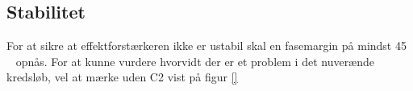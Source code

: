 \subsection{Stabilitet}
\label{effektforstaerker-stabilitet}

For at sikre at effektforstærkeren ikke er ustabil skal en fasemargin på mindst 45 \degrees~ opnås. For at kunne vurdere hvorvidt der er et problem i det nuverænde kredsløb, vel at mærke uden C2 vist på figur \ref{}